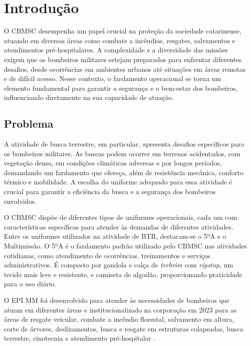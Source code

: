 \chapter{Introdução}



	O \acrfull{CBMSC} desempenha um papel crucial na proteção da sociedade catarinense, atuando em 
	diversas áreas como combate a incêndios, resgates, salvamentos e atendimentos pré-hospitalares. 
	A complexidade e a diversidade das missões exigem que os bombeiros militares estejam preparados 
	para enfrentar diferentes desafios, desde ocorrências em ambientes urbanos até situações em 
	áreas remotas e de difícil acesso.  Nesse contexto, o fardamento operacional se torna um 
	elemento fundamental para garantir a segurança e o bem-estar dos bombeiros, influenciando 
	diretamente na sua capacidade de atuação.

	\section{Problema}

		A atividade de busca terrestre, em particular, apresenta desafios específicos para os bombeiros militares.
		As buscas podem ocorrer em terrenos acidentados, com vegetação densa, em condições climáticas adversas e por longos períodos,
		demandando um fardamento que ofereça, além de resistência mecânica, conforto térmico e mobilidade.  
		A escolha do uniforme adequado para essa atividade é crucial para garantir a eficiência da busca e a segurança dos bombeiros envolvidos.

		O \acrshort{CBMSC} dispõe de diferentes tipos de uniformes operacionais, cada um com características específicas para atender
		às demandas de diferentes atividades.  Entre os uniformes utilizados na atividade de \acrfull{BTR}, destacam-se o 5ºA e o Multimissão.
		O 5ºA é o fardamento padrão utilizado pelo \acrshort{CBMSC} nas atividades cotidianas, como atendimento de ocorrências,
		treinamentos e serviços administrativos. É composto por gandola e calça de \textit{terbrim} com \textit{ripstop}, um tecido mais leve e 
		resistente, e camiseta de algodão, proporcionando praticidade para o uso diário.

		O \acrshort{EPI} \acrlong{MM} foi desenvolvido para atender às necessidades de bombeiros que atuam 
		em diferentes áreas e institucionalizado na corporação em 2023 para as áreas de resgate 
		veicular, combate a incêndio florestal, salvamento em altura, corte de árvores, 
		deslizamentos, busca e resgate em estruturas colapsadas, busca terrestre, cinotecnia 
		e atendimento pré-hospitalar \cite{res16}.

